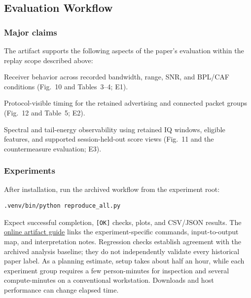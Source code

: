 \documentclass[nonacm,sigconf]{acmart}
\newcommand{\artifactguide}{\href{https://github.com/Tincyu/PhantomChannel/blob/main/docs/artifact-guide.md}{online artifact guide}}
\begin{document}
\subsection{Evaluation Workflow}
\subsubsection{Major claims}
The artifact supports the following aspects of the paper's evaluation within
the replay scope described above:
\begin{compactitem}
\item[(C1)] Receiver behavior across recorded bandwidth, range, SNR, and BPL/CAF
conditions (Fig.~10 and Tables~3--4; E1).
\item[(C2)] Protocol-visible timing for the retained advertising and connected
packet groups (Fig.~12 and Table~5; E2).
\item[(C3)] Spectral and tail-energy observability using retained IQ windows,
eligible features, and supported session-held-out score views (Fig.~11 and the
countermeasure evaluation; E3).
\end{compactitem}

\subsubsection{Experiments}
After installation, run the archived workflow from the experiment root:
\begin{verbatim}
.venv/bin/python reproduce_all.py
\end{verbatim}
Expect successful completion, \texttt{[OK]} checks, plots, and CSV/JSON results.
The \artifactguide{} links the experiment-specific commands, input-to-output
map, and interpretation notes. Regression checks establish agreement with the
archived analysis baseline; they do not independently validate every historical
paper label. As a planning estimate, setup takes about half an hour, while each
experiment group requires a few person-minutes for inspection and several
compute-minutes on a conventional workstation. Downloads and host performance
can change elapsed time.
\end{document}
